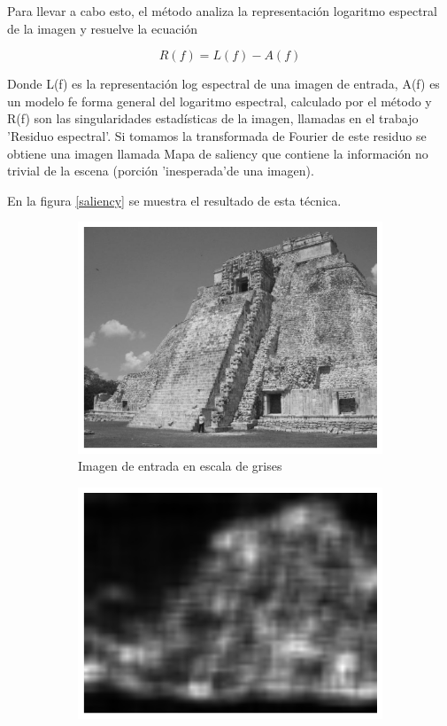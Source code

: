 \documentclass[letterpaper, 10 pt, conference]{ieeeconf}  %
\begin{document}
Para llevar a cabo esto, el método analiza la representación logaritmo espectral de la  imagen y resuelve la ecuación

 $$R(f) = L(f) -A(f)$$

Donde L(f) es la representación log espectral de una imagen de entrada, A(f) es un modelo fe forma general del logaritmo espectral, calculado por el método y R(f) son las singularidades estadísticas de la imagen, llamadas en el trabajo 'Residuo espectral'. Si tomamos la transformada de Fourier de este residuo se obtiene una imagen llamada Mapa de saliency que contiene la información no trivial de la escena (porción 'inesperada'de una imagen).

En la figura \ref{saliency} se muestra el resultado de esta técnica.

\begin{figure}[H]
\centering
    \begin{subfigure}{0.45\linewidth}
\includegraphics[width=\linewidth, scale=0.05]{images/gray.png}
    \caption{Imagen de entrada en escala de grises}
\label{fig:1a}
    \end{subfigure}\hfill
    \begin{subfigure}{0.45\linewidth}
\includegraphics[width=\linewidth, scale=0.05]{images/saliency1.png} 

\end{subfigure}
\end{figure}
\end{document}
